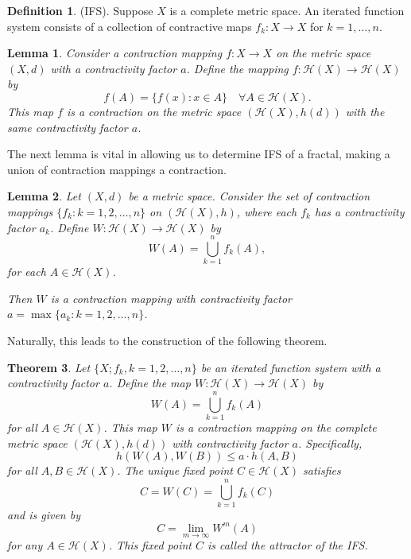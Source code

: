 \documentclass[a4paper,11pt, titlepage]{article}
\theoremstyle{definition}
\newtheorem{definition}{Definition}[section]
\theoremstyle{plain}
\newtheorem{theorem}{Theorem}[section]
\newtheorem{lemma}[theorem]{Lemma}
\theoremstyle{remark}
\theoremstyle{definition}
\begin{document}
\begin{definition}{(IFS). }
Suppose \( X \) is a complete metric space. An iterated function system consists of a collection of contractive maps \( f_k : X \to X \) for \( k = 1, \ldots, n \).
\end{definition}

\begin{lemma}
Consider a contraction mapping \( f : X \to X \) on the metric space \( (X, d) \) with a contractivity factor \( a \). Define the mapping \( f : \mathcal{H}(X) \to \mathcal{H}(X) \) by
\[
f(A) = \{ f(x) : x \in A \} \quad \forall A \in \mathcal{H}(X).
\]
This map \( f \) is a contraction on the metric space \( (\mathcal{H}(X), h(d)) \) with the same contractivity factor \( a \).
\end{lemma}

The next lemma is vital in allowing us to determine IFS of a fractal, making a union of contraction mappings a contraction.

\begin{lemma}
Let \((X, d)\) be a metric space. Consider the set of contraction mappings \(\{f_k : k = 1, 2, \ldots, n\}\) on \((\mathcal{H}(X), h)\), where each \(f_k\) has a contractivity factor \(a_k\). Define \(W : \mathcal{H}(X) \to \mathcal{H}(X)\) by
$$
W(A) = \bigcup_{k=1}^n f_k(A),
$$
for each \(A \in \mathcal{H}(X)\).

Then \(W\) is a contraction mapping with contractivity factor \(a = \max \{a_k : k = 1, 2, \ldots, n\}\).
\end{lemma}

Naturally, this leads to the construction of the following theorem.

\begin{theorem}
Let \(\{X; f_k, k = 1, 2, \ldots, n\}\) be an iterated function system with a contractivity factor \(a\). Define the map \(W : \mathcal{H}(X) \to \mathcal{H}(X)\) by
$$
W(A) = \bigcup_{k=1}^n f_k(A)
$$
for all \(A \in \mathcal{H}(X)\). This map \(W\) is a contraction mapping on the complete metric space \((\mathcal{H}(X), h(d))\) with contractivity factor \(a\). Specifically,
$$
h(W(A), W(B)) \leq a \cdot h(A, B)
$$
for all \(A, B \in \mathcal{H}(X)\). The unique fixed point \(C \in \mathcal{H}(X)\) satisfies
$$
C = W(C) = \bigcup_{k=1}^n f_k(C)
$$
and is given by
$$
C = \lim_{m \to \infty} W^m(A)
$$
for any \(A \in \mathcal{H}(X)\). This fixed point \(C \) is called the \textit{attractor} of the IFS.

\end{theorem}
\end{document}
